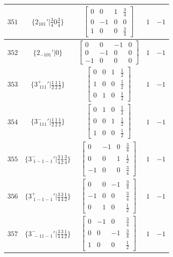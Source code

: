 \documentclass[fleqn,8pt]{jsarticle}
\begin{document}
\begin{longtable}{ccccc}
$ 351 $ & $ \{2{}_{101}{}'|\frac{3}{4} 0 \frac{3}{4}\} $ & $ \begin{bmatrix} 0 & 0 & 1 & \frac{3}{4} \\ 0 & -1 & 0 & 0 \\ 1 & 0 & 0 & \frac{3}{4} \end{bmatrix} $ & $ 1 $ & $ -1 $ \\ \hline
$ 352 $ & $ \{2{}_{-101}{}'|0\} $ & $ \begin{bmatrix} 0 & 0 & -1 & 0 \\ 0 & -1 & 0 & 0 \\ -1 & 0 & 0 & 0 \end{bmatrix} $ & $ 1 $ & $ -1 $ \\ \hline
$ 353 $ & $ \{3^{+}_{\,\,111}{}'|\frac{1}{2} \frac{1}{2} \frac{1}{2}\} $ & $ \begin{bmatrix} 0 & 0 & 1 & \frac{1}{2} \\ 1 & 0 & 0 & \frac{1}{2} \\ 0 & 1 & 0 & \frac{1}{2} \end{bmatrix} $ & $ 1 $ & $ -1 $ \\ \hline
$ 354 $ & $ \{3^{-}_{\,\,111}{}'|\frac{1}{2} \frac{1}{2} \frac{1}{2}\} $ & $ \begin{bmatrix} 0 & 1 & 0 & \frac{1}{2} \\ 0 & 0 & 1 & \frac{1}{2} \\ 1 & 0 & 0 & \frac{1}{2} \end{bmatrix} $ & $ 1 $ & $ -1 $ \\ \hline
$ 355 $ & $ \{3^{-}_{\,\,1-1-1}{}'|\frac{3}{4} \frac{1}{2} \frac{3}{4}\} $ & $ \begin{bmatrix} 0 & -1 & 0 & \frac{3}{4} \\ 0 & 0 & 1 & \frac{1}{2} \\ -1 & 0 & 0 & \frac{3}{4} \end{bmatrix} $ & $ 1 $ & $ -1 $ \\ \hline
$ 356 $ & $ \{3^{+}_{\,\,1-1-1}{}'|\frac{3}{4} \frac{3}{4} \frac{1}{2}\} $ & $ \begin{bmatrix} 0 & 0 & -1 & \frac{3}{4} \\ -1 & 0 & 0 & \frac{3}{4} \\ 0 & 1 & 0 & \frac{1}{2} \end{bmatrix} $ & $ 1 $ & $ -1 $ \\ \hline
$ 357 $ & $ \{3^{-}_{\,\,-11-1}{}'|\frac{3}{4} \frac{3}{4} \frac{1}{2}\} $ & $ \begin{bmatrix} 0 & -1 & 0 & \frac{3}{4} \\ 0 & 0 & -1 & \frac{3}{4} \\ 1 & 0 & 0 & \frac{1}{2} \end{bmatrix} $ & $ 1 $ & $ -1 $ \\ \hline

\end{longtable}
\end{document}
